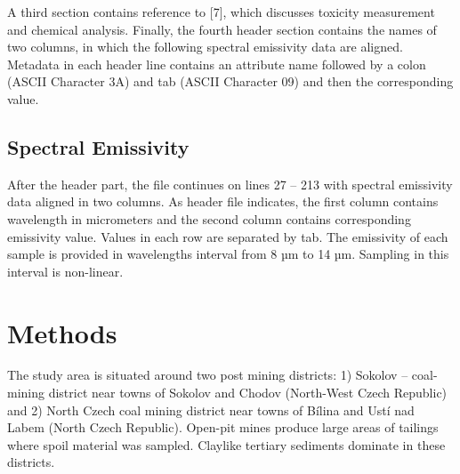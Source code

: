 A third section contains reference to [7], which discusses toxicity measurement and chemical analysis. Finally, the fourth header section contains the names of two columns, in which the following spectral emissivity data are aligned. Metadata in each header line contains an attribute name followed by a colon (ASCII Character 3A) and tab (ASCII Character 09) and then the corresponding value.

\subsection{Spectral Emissivity}

After the header part, the file continues on lines 27 – 213 with spectral emissivity data aligned in two columns. As header file indicates, the first column contains wavelength in micrometers and the second column contains corresponding emissivity value. Values in each row are separated by tab. The emissivity of each sample is provided in wavelengths interval from 8 µm to 14 µm. Sampling in this interval is non-linear.


\section{Methods}

The study area is situated around two post mining districts: 1) Sokolov – coal-mining district near towns of Sokolov and Chodov (North-West Czech Republic) and 2) North Czech coal mining district near towns of Bílina and Ustí nad Labem (North Czech Republic). Open-pit mines produce large areas of tailings where spoil material was sampled. Claylike tertiary sediments dominate in these districts.

